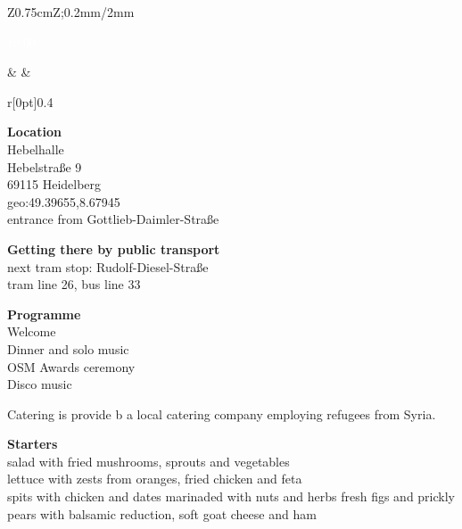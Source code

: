 \begin{landscape}
\begin{center}
    \label{social-event}%
    \enlargethispage{1\baselineskip}%
    \newlength\socialEventBoxWidth
    \setlength{\socialEventBoxWidth}{10.82cm}
    \newlength\socialEventSectionSep
    \setlength{\socialEventSectionSep}{\baselineskip}
    \noindent\begin{tabular}{Z{0.75cm}Z{\socialEventBoxWidth};{0.2mm/2mm}}
      \parbox[t]{\linewidth}{%
        \textcolor{white}{19:00}%
      }%
      &
      \tabularnewline
      &
      \begin{minipage}[t]{\socialEventBoxWidth}
        \noindent\begin{minipage}[t]{0.47\linewidth}
          \vspace{-0.56\baselineskip}
          \begin{wrapfigure}[6]{r}[0pt]{0.4\linewidth}%
            \vspace{-1\baselineskip}%
          \end{wrapfigure}%
          \textbf{Location}\\
          Hebelhalle\\
          Hebelstraße 9\\
          69115 Heidelberg\\
          geo:49.39655,8.67945\\
          entrance from Gottlieb-Daimler-Straße

          \vspace{\socialEventSectionSep}
          \textbf{Getting there by public transport}\\
          next tram stop: Rudolf-Diesel-Straße\\
          tram line 26, bus line 33

          \vspace{\socialEventSectionSep}
          \textbf{Programme}\\
          Welcome\\
          Dinner and solo music\\
          OSM Awards ceremony\\
          Disco music

          \vspace{\baselineskip}
          Catering is provide b a local catering company employing refugees from Syria.
        \end{minipage}
        \hfill
        \noindent\begin{minipage}[t]{0.47\linewidth}
          \textbf{Starters}\\
          salad with fried mushrooms, sprouts and vegetables\\
          lettuce with zests from oranges, fried chicken and feta\\
          spits with chicken and dates marinaded with nuts and herbs
          fresh figs and prickly pears with balsamic reduction, soft goat cheese and ham


\end{minipage}
\end{minipage}
\end{tabular}
\end{center}
\end{landscape}

